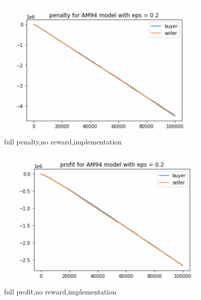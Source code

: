 \documentclass[11pt]{article}
\begin{document}
\begin{figure}[H]
	\begin{center}
	\includegraphics[width=0.9\textwidth]{34.PNG}
	\end{center}
	\caption{full penalty,no reward,implementation}
	\label{FIG.34}
\end{figure}

\begin{figure}[H]
	\begin{center}
	\includegraphics[width=0.9\textwidth]{35.PNG}
	\end{center}
	\caption{full profit,no reward,implementation}
	\label{FIG.35}
\end{figure}
\end{document}
